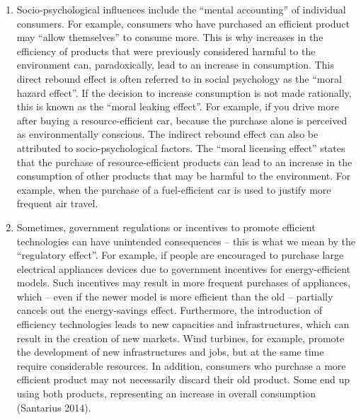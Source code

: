 \documentclass[
  a4paper,
  DIV=11,
  numbers=noendperiod,
  oneside,
  openany]{scrreprt}
\begin{document}
\begin{enumerate}
\def\labelenumi{\arabic{enumi}.}
\setcounter{enumi}{1}
\item
  Socio-psychological influences include the ``mental accounting'' of
  individual consumers. For example, consumers who have purchased an
  efficient product may ``allow themselves'' to consume more. This is
  why increases in the efficiency of products that were previously
  considered harmful to the environment can, paradoxically, lead to an
  increase in consumption. This direct rebound effect is often referred
  to in social psychology as the ``moral hazard effect''. If the
  decision to increase consumption is not made rationally, this is known
  as the ``moral leaking effect''. For example, if you drive more after
  buying a resource-efficient car, because the purchase alone is
  perceived as environmentally conscious. The indirect rebound effect
  can also be attributed to socio-psychological factors. The ``moral
  licensing effect'' states that the purchase of resource-efficient
  products can lead to an increase in the consumption of other products
  that may be harmful to the environment. For example, when the purchase
  of a fuel-efficient car is used to justify more frequent air travel.
\item
  Sometimes, government regulations or incentives to promote efficient
  technologies can have unintended consequences -- this is what we mean
  by the ``regulatory effect''. For example, if people are encouraged to
  purchase large electrical appliances devices due to government
  incentives for energy-efficient models. Such incentives may result in
  more frequent purchases of appliances, which -- even if the newer
  model is more efficient than the old -- partially cancels out the
  energy-savings effect. Furthermore, the introduction of efficiency
  technologies leads to new capacities and infrastructures, which can
  result in the creation of new markets. Wind turbines, for example,
  promote the development of new infrastructures and jobs, but at the
  same time require considerable resources. In addition, consumers who
  purchase a more efficient product may not necessarily discard their
  old product. Some end up using both products, representing an increase
  in overall consumption (Santarius 2014).
\end{enumerate}
\end{document}
